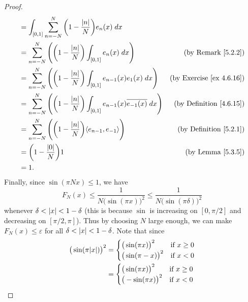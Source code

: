 \begin{proof}
\begin{align*}
         & = \int_{[0, 1]} \sum_{n = -N}^N \bigg(1 - \frac{\abs*{n}}{N}\bigg) e_n(x) \; dx                                                                               \\
         & = \sum_{n = -N}^N \Bigg(\bigg(1 - \frac{\abs*{n}}{N}\bigg) \int_{[0, 1]} e_n(x) \; dx\Bigg)                            & \text{(by Remark \ref{5.2.2})}       \\
         & = \sum_{n = -N}^N \Bigg(\bigg(1 - \frac{\abs*{n}}{N}\bigg) \int_{[0, 1]} e_{n - 1}(x) e_1(x) \; dx\Bigg)               & \text{(by Exercise \ref{ex 4.6.16})} \\
         & = \sum_{n = -N}^N \Bigg(\bigg(1 - \frac{\abs*{n}}{N}\bigg) \int_{[0, 1]} e_{n - 1}(x) \overline{e_{-1}(x)} \; dx\Bigg) & \text{(by Definition \ref{4.6.15})}  \\
         & = \sum_{n = -N}^N \Bigg(\bigg(1 - \frac{\abs*{n}}{N}\bigg) \inner*{e_{n - 1}, e_{-1}}\Bigg)                            & \text{(by Definition \ref{5.2.1})}   \\
         & = \bigg(1 - \frac{\abs*{0}}{N}\bigg) 1                                                                                 & \text{(by Lemma \ref{5.3.5})}        \\
         & = 1.
    \end{align*}
    Finally, since \(\sin(\pi N x) \leq 1\), we have
    \[
        F_N(x) \leq \frac{1}{N \big(\sin(\pi x)\big)^2} \leq \frac{1}{N \big(\sin(\pi \delta)\big)^2}
    \]
    whenever \(\delta < \abs*{x} < 1 - \delta\)
    (this is because \(\sin\) is increasing on \([0, \pi / 2]\) and decreasing on \([\pi / 2, \pi]\)).
    Thus by choosing \(N\) large enough, we can make \(F_N (x) \leq \varepsilon\) for all \(\delta < \abs*{x} < 1 - \delta\).
    Note that since
    \begin{align*}
        \big(\sin(\pi \abs*{x})\big)^2 & = \begin{cases}
                                               \big(\sin(\pi x)\big)^2  & \text{if } x \geq 0 \\
                                               \big(\sin(\pi -x)\big)^2 & \text{if } x < 0
                                           \end{cases} \\
                                       & = \begin{cases}
                                               \big(\sin(\pi x)\big)^2  & \text{if } x \geq 0 \\
                                               \big(-\sin(\pi x)\big)^2 & \text{if } x < 0

\end{cases}
\end{align*}
\end{proof}
